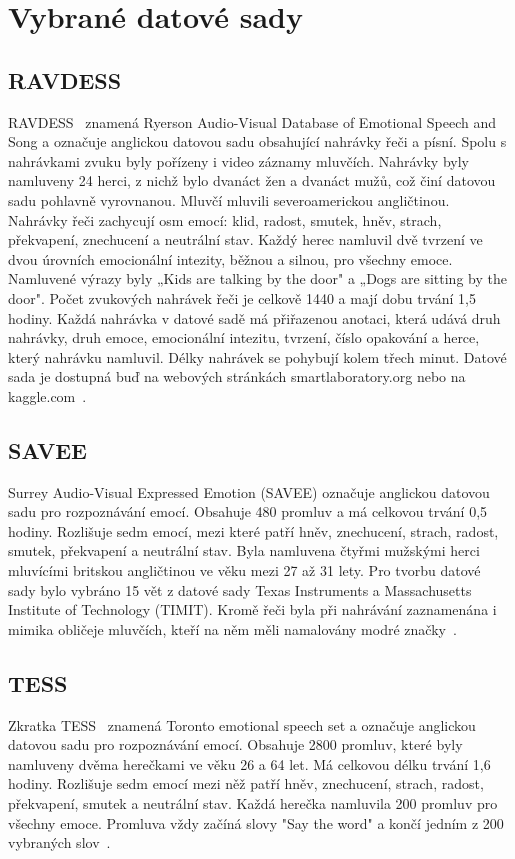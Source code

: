 \documentclass[FM,BP]{tulthesis}
\newcommand{\extend}[1]{\todo[color=green!40]{#1}}
\begin{document}
\section{Vybrané datové sady}
\subsection{RAVDESS} \label{desc/ravdess} %
RAVDESS~\cite{Livingstone2018} znamená Ryerson Audio-Visual Database of Emotional Speech and Song a označuje anglickou datovou sadu obsahující nahrávky řeči a písní. Spolu s nahrávkami zvuku byly pořízeny i video záznamy mluvčích. Nahrávky byly namluveny 24 herci, z nichž bylo dvanáct žen a dvanáct mužů, což činí datovou sadu pohlavně vyrovnanou. Mluvčí mluvili severoamerickou angličtinou. Nahrávky řeči zachycují osm emocí: klid, radost, smutek, hněv, strach, překvapení, znechucení a neutrální stav. Každý herec namluvil dvě tvrzení ve dvou úrovních emocionální intezity, běžnou a silnou, pro všechny emoce. Namluvené výrazy byly „Kids are talking by the door" a „Dogs are sitting by the door". Počet zvukových nahrávek řeči je celkově 1440 a mají dobu trvání 1,5 hodiny. Každá nahrávka v datové sadě má přiřazenou anotaci, která udává druh nahrávky, druh emoce, emocionální intezitu, tvrzení, číslo opakování a herce, který nahrávku namluvil. Délky nahrávek se pohybují kolem třech minut. Datové sada je dostupná buď na webových stránkách smartlaboratory.org nebo na kaggle.com~\cite{smart_lab}.

\subsection{SAVEE} \label{desc/savee} %
Surrey Audio-Visual Expressed Emotion (SAVEE) označuje anglickou datovou sadu pro rozpoznávání emocí. Obsahuje 480 promluv a má celkovou trvání 0,5 hodiny. Rozlišuje sedm emocí, mezi které patří hněv, znechucení, strach, radost, smutek, překvapení a neutrální stav. Byla namluvena čtyřmi mužskými herci mluvícími britskou angličtinou ve věku mezi 27 až 31 lety. Pro tvorbu datové sady bylo vybráno 15 vět z datové sady Texas Instruments a Massachusetts Institute of Technology (TIMIT). \extend{reference} 
Kromě řeči byla při nahrávání zaznamenána i mimika obličeje mluvčích, kteří na něm měli namalovány modré značky~\cite{savee}.

\subsection{TESS} \label{desc/tess} %
Zkratka TESS~\cite{SP2/E8H2MF_2020} znamená Toronto emotional speech set a označuje anglickou datovou sadu pro rozpoznávání emocí. Obsahuje 2800 promluv, které byly namluveny dvěma herečkami ve věku 26 a 64 let. Má celkovou délku trvání 1,6 hodiny. Rozlišuje sedm emocí mezi něž patří hněv, znechucení, strach, radost, překvapení, smutek a neutrální stav. Každá herečka namluvila 200 promluv pro všechny emoce. Promluva vždy začíná slovy "Say the word" a končí jedním z 200 vybraných slov~\cite{tess}.
\end{document}
